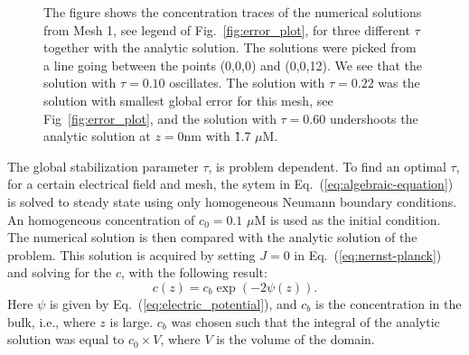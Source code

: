 \begin{figure}[b]
    \begin{minipage}[t]{\leftfigsize}
    \end{minipage}
    \hfill
    \begin{minipage}{\rightfigsize}
      \caption{The figure shows the concentration traces of the numerical solutions from Mesh 1, see legend of Fig.~\ref{fig:error_plot}, for three different $\tau$ together with the analytic solution. The solutions were picked from a line going between the points (0,0,0) and (0,0,12). We see that the solution with $\tau=0.10$ oscillates. The solution with $\tau=0.22$ was the solution with smallest global error for this mesh, see Fig~\ref{fig:error_plot}, and the solution with $\tau=0.60$ undershoots the analytic solution at $z=0$nm with \~1.7 $\mu$M.}
      \label{fig:traces_mesh_1}
    \end{minipage}
\end{figure}

The global stabilization parameter $\tau$, is problem dependent. To find an optimal $\tau$, for a certain electrical field and mesh, the sytem in Eq.~(\ref{eq:algebraic-equation}) is solved to steady state using only homogeneous Neumann boundary conditions. An homogeneous concentration of $c_0=0.1$ $\mu$M is used as the initial condition. The numerical solution is then compared with the analytic solution of the problem. This solution is acquired by setting $J=0$ in Eq.~(\ref{eq:nernst-planck}) and solving for the $c$, with the following result:
\begin{equation}
  \label{eq:analytic-solution}
  c(z) = c_b\exp(-2\psi(z)).
\end{equation}
Here $\psi$ is given by Eq.~(\ref{eq:electric_potential}), and $c_b$ is the concentration in the bulk, i.e., where $z$ is large. $c_b$ was chosen such that the integral of the analytic solution was equal to $c_0\times V$, where $V$ is the volume of the domain.\par

